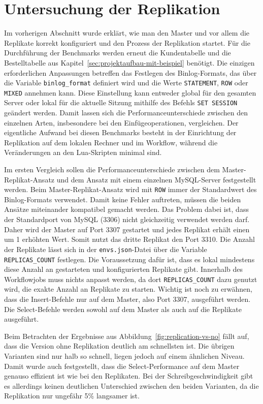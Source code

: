 \section{Untersuchung der Replikation}\label{sec:replication-analyse}

Im vorherigen Abschnitt wurde erklärt, wie man den Master und vor allem die Replikate korrekt konfiguriert und den Prozess der Replikation startet.
Für die Durchführung der Benchmarks werden erneut die Kundentabelle und die Bestelltabelle aus Kapitel~\ref{sec:projektaufbau-mit-beispiel} benötigt.
Die einzigen erforderlichen Anpassungen betreffen das Festlegen des Binlog-Formats, das über die Variable \texttt{binlog\_format} definiert wird und die Werte \texttt{STATEMENT}, \texttt{ROW} oder \texttt{MIXED} annehmen kann.
Diese Einstellung kann entweder global für den gesamten Server oder lokal für die aktuelle Sitzung mithilfe des Befehls \texttt{SET SESSION} geändert werden.
Damit lassen sich die Performanceunterschiede zwischen den einzelnen Arten, insbesondere bei den Einfügeoperationen, vergleichen.
Der eigentliche Aufwand bei diesen Benchmarks besteht in der Einrichtung der Replikation auf dem lokalen Rechner und im Workflow, während die Veränderungen an den Lua-Skripten minimal sind.

Im ersten Vergleich sollen die Performanceunterschiede zwischen dem Master-Replikat-Ansatz und dem Ansatz mit einem einzelnen MySQL-Server festgestellt werden.
Beim Master-Replikat-Ansatz wird mit \texttt{ROW} immer der Standardwert des Binlog-Formats verwendet.
Damit keine Fehler auftreten, müssen die beiden Ansätze miteinander kompatibel gemacht werden.
Das Problem dabei ist, dass der Standardport von MySQL (3306) nicht gleichzeitig verwendet werden darf.
Daher wird der Master auf Port 3307 gestartet und jedes Replikat erhält einen um 1 erhöhten Wert.
Somit nutzt das dritte Replikat den Port 3310.
Die Anzahl der Replikate lässt sich in der \texttt{envs.json}-Datei über die Variable \texttt{REPLICAS\_COUNT} festlegen.
Die Voraussetzung dafür ist, dass es lokal mindestens diese Anzahl an gestarteten und konfigurierten Replikate gibt.
Innerhalb des Workflowjobs muss nichts anpasst werden, da dort \texttt{REPLICAS\_COUNT} dazu genutzt wird, die exakte Anzahl an Replikate zu starten.
Wichtig ist noch zu erwähnen, dass die Insert-Befehle nur auf dem Master, also Port 3307, ausgeführt werden.
Die Select-Befehle werden sowohl auf dem Master als auch auf die Replikate ausgeführt.

Beim Betrachten der Ergebnisse aus Abbildung~\ref{fig:replication-vs-no} fällt auf, dass die Version ohne Replikation deutlich am schnellsten ist.
Die übrigen Varianten sind nur halb so schnell, liegen jedoch auf einem ähnlichen Niveau.
Damit wurde auch festgestellt, dass die Select-Performance auf dem Master genauso effizient ist wie bei den Replikaten.
Bei der Schreibgeschwindigkeit gibt es allerdings keinen deutlichen Unterschied zwischen den beiden Varianten, da die Replikation nur ungefähr 5\% langsamer ist.

